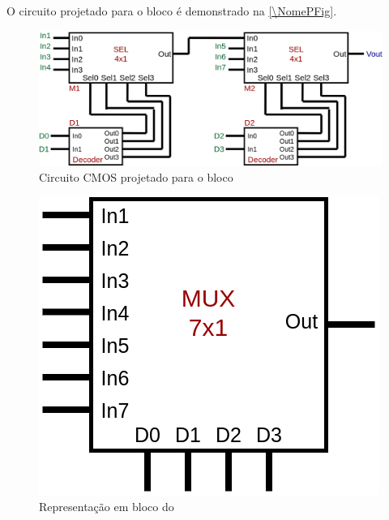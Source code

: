 O circuito projetado para o bloco \'e demonstrado na \autoref{\NomePFig}.

\begin{figure}[htbp]
 \centering
    \centering
    \caption{\label{\NomePFig}Circuito CMOS projetado para o bloco \NomeBloco}
    \includegraphics[scale=0.3]{Circuitos/mux7x1.png}
\end{figure}

\begin{figure}[htbp]
 \centering
    \centering
    \caption{\label{\NomeSFig}Representação em bloco do \NomeBloco} 
    \includegraphics[scale=0.3]{Circuitos/mux7x1_block.png}
\end{figure}